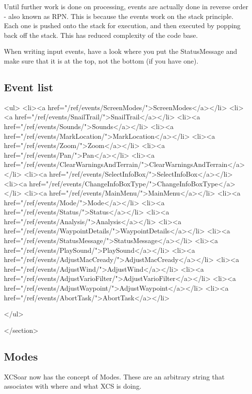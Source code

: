 Until further work is done on processing, events are actually done in
reverse order - also known as RPN. This is because the events work on
the stack principle. Each one is pushed onto the stack for execution,
and then executed by popping back off the stack. This has reduced
complexity of the code base.

When writing input events, have a look where you put the StatusMessage
and make sure that it is at the top, not the bottom (if you have one).

\subsection{Event list}

				<ul>
					<li><a href="/ref/events/ScreenModes/">ScreenModes</a></li>
					<li><a href="/ref/events/SnailTrail/">SnailTrail</a></li>
					<li><a href="/ref/events/Sounds/">Sounds</a></li>
					<li><a href="/ref/events/MarkLocation/">MarkLocation</a></li>
					<li><a href="/ref/events/Zoom/">Zoom</a></li>
					<li><a href="/ref/events/Pan/">Pan</a></li>
					<li><a href="/ref/events/ClearWarningsAndTerrain/">ClearWarningsAndTerrain</a></li>
					<li><a href="/ref/events/SelectInfoBox/">SelectInfoBox</a></li>
					<li><a href="/ref/events/ChangeInfoBoxType/">ChangeInfoBoxType</a></li>
					<li><a href="/ref/events/MainMenu/">MainMenu</a></li>
					<li><a href="/ref/events/Mode/">Mode</a></li>
					<li><a href="/ref/events/Status/">Status</a></li>
					<li><a href="/ref/events/Analysis/">Analysis</a></li>
					<li><a href="/ref/events/WaypointDetails/">WaypointDetails</a></li>
					<li><a href="/ref/events/StatusMessage/">StatusMessage</a></li>
					<li><a href="/ref/events/PlaySound/">PlaySound</a></li>
					<li><a href="/ref/events/AdjustMacCready/">AdjustMacCready</a></li>
					<li><a href="/ref/events/AdjustWind/">AdjustWind</a></li>
					<li><a href="/ref/events/AdjustVarioFilter/">AdjustVarioFilter</a></li>
					<li><a href="/ref/events/AdjustWaypoint/">AdjustWaypoint</a></li>
					<li><a href="/ref/events/AbortTask/">AbortTask</a></li>

				</ul>

			</section>

\subsection{Modes}

XCSoar now has the concept of Modes. These are an arbitrary
string that associates with where and what XCS is doing.

